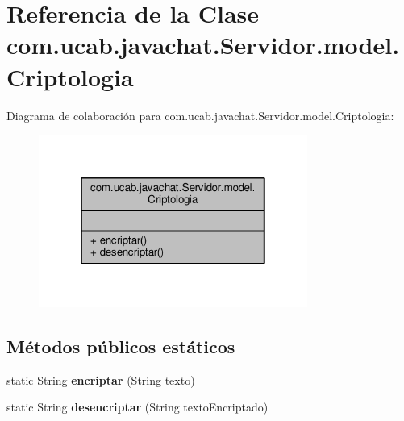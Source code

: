 \hypertarget{classcom_1_1ucab_1_1javachat_1_1_servidor_1_1model_1_1_criptologia}{\section{Referencia de la Clase com.\-ucab.\-javachat.\-Servidor.\-model.\-Criptologia}
\label{classcom_1_1ucab_1_1javachat_1_1_servidor_1_1model_1_1_criptologia}
}


Diagrama de colaboración para com.\-ucab.\-javachat.\-Servidor.\-model.\-Criptologia\-:
\nopagebreak
\begin{figure}[H]
\begin{center}
\leavevmode
\includegraphics[width=250pt]{d2/d11/classcom_1_1ucab_1_1javachat_1_1_servidor_1_1model_1_1_criptologia__coll__graph}
\end{center}
\end{figure}
\subsection*{Métodos públicos estáticos}
\begin{DoxyCompactItemize}
\item 
\hypertarget{classcom_1_1ucab_1_1javachat_1_1_servidor_1_1model_1_1_criptologia_a0a816425dbef403c92d0f858e6a910cd}{static String {\bfseries encriptar} (String texto)}\label{classcom_1_1ucab_1_1javachat_1_1_servidor_1_1model_1_1_criptologia_a0a816425dbef403c92d0f858e6a910cd}

\item 
\hypertarget{classcom_1_1ucab_1_1javachat_1_1_servidor_1_1model_1_1_criptologia_ae580b0995ce546a2e8b37c819651d240}{static String {\bfseries desencriptar} (String texto\-Encriptado)}\label{classcom_1_1ucab_1_1javachat_1_1_servidor_1_1model_1_1_criptologia_ae580b0995ce546a2e8b37c819651d240}

\end{DoxyCompactItemize}


